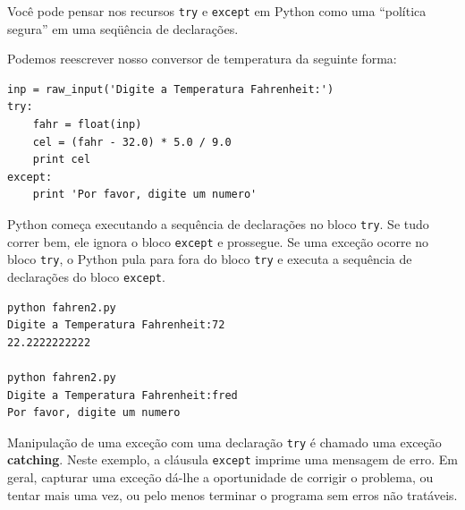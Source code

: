 
Você pode pensar nos recursos {\tt try} e {\tt except}
em Python como uma ``política segura'' em uma seqüência de
declarações.


Podemos reescrever nosso conversor de temperatura da seguinte forma:

\beforeverb
\begin{verbatim}
inp = raw_input('Digite a Temperatura Fahrenheit:')
try:
    fahr = float(inp)
    cel = (fahr - 32.0) * 5.0 / 9.0
    print cel
except:
    print 'Por favor, digite um numero'
\end{verbatim}
\afterverb
%

Python começa executando a
sequência de declarações no
bloco {\tt try}. Se tudo correr
bem, ele ignora o bloco {\tt except} e prossegue. Se uma
exceção ocorre no bloco {\tt try},
o Python pula para fora do bloco {\tt try}  e
executa a sequência de declarações do bloco {\tt except}.


\beforeverb
\begin{verbatim}
python fahren2.py 
Digite a Temperatura Fahrenheit:72
22.2222222222

python fahren2.py 
Digite a Temperatura Fahrenheit:fred
Por favor, digite um numero
\end{verbatim}
\afterverb
%


Manipulação de uma exceção com uma declaração {\tt try} é chamado uma exceção {\bf
catching}. Neste exemplo, a cláusula {\tt except} imprime uma mensagem de erro. Em geral,
capturar uma exceção dá-lhe a oportunidade de corrigir o problema, ou tentar
mais uma vez, ou pelo menos terminar o programa sem erros não tratáveis.

